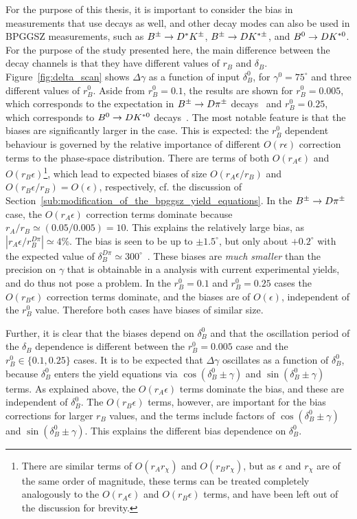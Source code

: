 For the purpose of this thesis, it is important to consider the bias in measurements that use \BtoDpi decays as well, and other \B decay modes can also be used in BPGGSZ measurements, such as ${{B}^\pm}\rightarrow{\ensuremath{{D}^*}}{\ensuremath{{K}^\pm}}$, ${{B}^\pm}\rightarrow{\ensuremath{D}}{\ensuremath{{K}^{*\pm}}}$, and ${{B}^0}\rightarrow{\ensuremath{D}}{\ensuremath{{K}^{*0}}}$. For the purpose of the study presented here, the main difference between the decay channels is that they have different values of $r_B$ and $\delta_B$. Figure~\ref{fig:delta_scan} shows $\Delta\gamma$ as a function of input $\delta_B^0$, for $\gamma^0=75^\circ$ and three different values of $r_B^0$. Aside from $r_B^0=0.1$, the results are shown for $r_B^0=0.005$, which corresponds to the expectation in ${{B}^\pm}\rightarrow{\ensuremath{D}}{\ensuremath{{\pi}^\pm}}$ decays~\cite{kenzieEstimatingEnsuremathPi2016} and $r_B^0=0.25$, which corresponds to ${{B}^0}\rightarrow{\ensuremath{D}}{\ensuremath{{K}^{*0}}}$ decays~\cite{Gammacombo2016,Gammacombo2018}. The most notable feature is that the biases are significantly larger in the \BtoDpi case. This is expected: the $r^0_B$ dependent behaviour is governed by the relative importance of different $O(r\epsilon)$ correction terms to the phase-space distribution. There are terms of both $O(r_A\epsilon)$ and $O(r_B\epsilon)$\footnote{There are similar terms of $O(r_Ar_\chi)$ and $O(r_Br_\chi)$, but as $\epsilon$ and $r_\chi$ are of the same order of magnitude, these terms can be treated completely analogously to the $O(r_A\epsilon)$ and $O(r_B\epsilon)$ terms, and have been left out of the discussion for brevity.}, which lead to expected biases of size $O(r_A\epsilon/r_B)$ and $O(r_B\epsilon/r_B)=O(\epsilon)$, respectively, cf. the discussion of Section~\ref{sub:modification_of_the_bpggsz_yield_equations}. 
In the ${{B}^\pm}\rightarrow{\ensuremath{D}}{\ensuremath{{\pi}^\pm}}$ case, the $O(r_A\epsilon)$ correction terms dominate because $r_A/r_B\simeq (0.05/0.005)=10$. This explains the relatively large bias, as $|r_A\epsilon/r_B^{D\pi}|\simeq 4\%$. The bias is seen to be up to {}$\pm1.5^\circ$, but only about $+0.2^\circ$ with the expected value of $\delta_B^{D\pi}\simeq300^\circ$~\cite{Gammacombo2016,kenzieEstimatingEnsuremathPi2016}. These biases are \emph{much smaller} than the precision on $\gamma$ that is obtainable in a \BtoDpi analysis with current experimental yields, and do thus not pose a problem.
In the $r_B^0=0.1$ and $r_B^0=0.25$ cases the $O(r_B\epsilon)$ correction terms dominate, and the biases are of $O(\epsilon)$, independent of the $r_B^0$ value. Therefore both cases have biases of similar size.



Further, it is clear that the biases depend on $\delta_B^0$ and that the oscillation period of the $\delta_B$ dependence is different between the $r^0_B=0.005$ case and the $r_B^0\in\{0.1, 0.25\}$ cases. It is to be expected that $\Delta\gamma$ oscillates as a function of $\delta^0_B$, because $\delta_B^0$ enters the yield equations via $\cos(\delta_B^0\pm\gamma)$ and $\sin(\delta_B^0\pm\gamma)$ terms.  As explained above, the $O(r_A\epsilon)$ terms dominate the \BtoDpi bias, and these are independent of $\delta_B^0$. The $O(r_B\epsilon)$ terms, however, are important for the bias corrections for larger $r_B$ values, and the terms include factors of $\cos(\delta_B^0\pm\gamma)$ and $\sin(\delta_B^0\pm\gamma)$. This explains the different bias dependence on $\delta^0_B$. 



